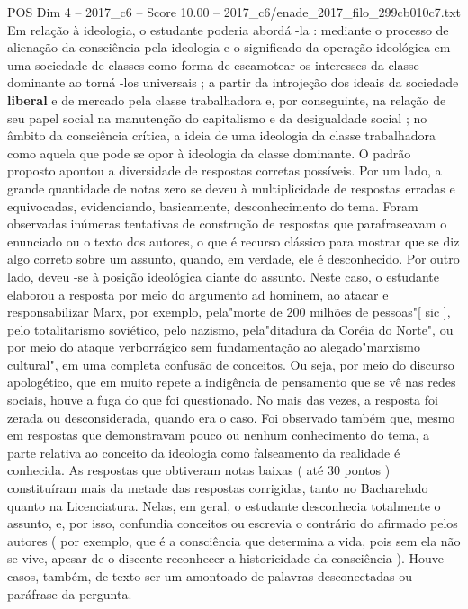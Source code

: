 \begin{textsample}{POS Dim 4 – 2017\_c6 – Score 10.00 – 2017\_c6/enade\_2017\_filo\_299cb010c7.txt}
Em relação à ideologia, o estudante poderia abordá -la : mediante o processo de alienação da consciência pela ideologia e o significado da operação ideológica em uma sociedade de classes como forma de escamotear os interesses da classe dominante ao torná -los universais ; a partir da introjeção dos ideais da sociedade \textbf{liberal} e de mercado pela classe trabalhadora e, por conseguinte, na relação de seu papel social na manutenção do capitalismo e da desigualdade social ; no âmbito da consciência crítica, a ideia de uma ideologia da classe trabalhadora como aquela que pode se opor à ideologia da classe dominante.
O padrão proposto apontou a diversidade de respostas corretas possíveis.
Por um lado, a grande quantidade de notas zero se deveu à multiplicidade de respostas erradas e equivocadas, evidenciando, basicamente, desconhecimento do tema.
Foram observadas inúmeras tentativas de construção de respostas que parafraseavam o enunciado ou o texto dos autores, o que é recurso clássico para mostrar que se diz algo correto sobre um assunto, quando, em verdade, ele é desconhecido.
Por outro lado, deveu -se à posição ideológica diante do assunto.
Neste caso, o estudante elaborou a resposta por meio do argumento ad hominem, ao atacar e responsabilizar Marx, por exemplo, pela"morte de 200 milhões de pessoas"[ sic ], pelo totalitarismo soviético, pelo nazismo, pela"ditadura da Coréia do Norte", ou por meio do ataque verborrágico sem fundamentação ao alegado"marxismo cultural", em uma completa confusão de conceitos.
Ou seja, por meio do discurso apologético, que em muito repete a indigência de pensamento que se vê nas redes sociais, houve a fuga do que foi questionado.
No mais das vezes, a resposta foi zerada ou desconsiderada, quando era o caso.
Foi observado também que, mesmo em respostas que demonstravam pouco ou nenhum conhecimento do tema, a parte relativa ao conceito da ideologia como falseamento da realidade é conhecida.
As respostas que obtiveram notas baixas ( até 30 pontos ) constituíram mais da metade das respostas corrigidas, tanto no Bacharelado quanto na Licenciatura.
Nelas, em geral, o estudante desconhecia totalmente o assunto, e, por isso, confundia conceitos ou escrevia o contrário do afirmado pelos autores ( por exemplo, que é a consciência que determina a vida, pois sem ela não se vive, apesar de o discente reconhecer a historicidade da consciência ).
Houve casos, também, de texto ser um amontoado de palavras desconectadas ou paráfrase da pergunta.

\end{textsample}
